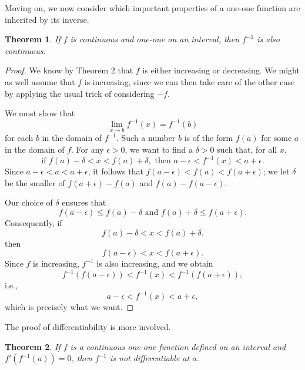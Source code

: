 \documentclass{article}
\numberwithin{corollary}{subsection}
\numberwithin{definition}{subsection}
\numberwithin{lemma}{subsection}
\newtheorem{theorem}{Theorem}
\numberwithin{theorem}{subsection}
\begin{document}
Moving on, we now consider which important properties of a one-one function are
inherited by its inverse.

\begin{theorem}
  If $f$ is continuous and one-one on an interval, then $f^{-1}$ is also
  continuous.
\end{theorem}
\begin{proof}
  We know by Theorem 2 that $f$ is either increasing or decreasing. We might as
  well assume that $f$ is increasing, since we can then take care of the other
  case by applying the usual trick of considering $-f$.

  We must show that \[
    \lim_{x \to b} f^{-1}(x) = f^{-1}(b)
  \] for each $b$ in the domain of $f^{-1}$. Such a number $b$ is of the form
  $f(a)$ for some $a$ in the domain of $f$. For any $\epsilon > 0$, we want to
  find a $\delta > 0$ such that, for all $x$, \[
    \text{if } f(a) - \delta < x < f(a) + \delta,
    \text{ then } a - \epsilon < f^{-1}(x) < a + \epsilon.
  \] Since $a - \epsilon < a < a + \epsilon$, it follows that $f(a - \epsilon)
  < f(a) < f(a + \epsilon)$; we let $\delta$ be the smaller of $f(a + \epsilon)
  - f(a)$ and $f(a) - f(a - \epsilon)$.

  Our choice of $\delta$ ensures that \[
    f(a - \epsilon)
    \leq f(a) - \delta \text{ and } f(a) + \delta \leq f(a + \epsilon).
  \] Consequently, if \[
    f(a) - \delta < x < f(a) + \delta.
  \] then \[
    f(a - \epsilon) < x < f(a + \epsilon).
    \] Since $f$ is increasing, $f^{-1}$ is also increasing, and we obtain \[
    f^{-1}(f(a - \epsilon)) < f^{-1}(x) < f^{-1}(f(a + \epsilon)),
  \] i.e., \[
    a - \epsilon < f^{-1}(x) < a + \epsilon,
  \] which is precisely what we want.
\end{proof}

The proof of differentiability is more involved.

\begin{theorem}
  If $f$ is a continuous one-one function defined on an interval and
  $f'(f^{-1}(a)) = 0$, then $f^{-1}$ is \emph{not} differentiable at $a$.
\end{theorem}
\end{document}
